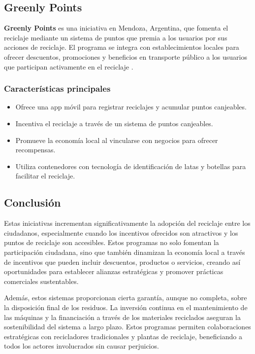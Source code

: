 \documentclass[main.tex]{subfiles}
\begin{document}
\subsection{Greenly Points}
\textbf{Greenly Points} es una iniciativa en Mendoza, Argentina, que fomenta el reciclaje mediante un sistema de puntos que premia a los usuarios por sus acciones de reciclaje. El programa se integra con establecimientos locales para ofrecer descuentos, promociones y beneficios en transporte público a los usuarios que participan activamente en el reciclaje \cite{greenlypoints2024}.

\subsubsection*{Características principales}
\begin{itemize}
    \item Ofrece una app móvil para registrar reciclajes y acumular puntos canjeables.
    \item Incentiva el reciclaje a través de un sistema de puntos canjeables.
    \item Promueve la economía local al vincularse con negocios para ofrecer recompensas.
    \item Utiliza contenedores con tecnología de identificación de latas y botellas para facilitar el reciclaje.
\end{itemize}

\subsection{Conclusión}
Estas iniciativas incrementan significativamente la adopción del reciclaje entre los ciudadanos, especialmente cuando los incentivos ofrecidos son atractivos y los puntos de reciclaje son accesibles. Estos programas no solo fomentan la participación ciudadana, sino que también dinamizan la economía local a través de incentivos que pueden incluir descuentos, productos o servicios, creando así oportunidades para establecer alianzas estratégicas y promover prácticas comerciales sustentables.

Además, estos sistemas proporcionan cierta garantía, aunque no completa, sobre la disposición final de los residuos. La inversión continua en el mantenimiento de las máquinas y la financiación a través de los materiales reciclados aseguran la sostenibilidad del sistema a largo plazo. Estos programas permiten colaboraciones estratégicas con recicladores tradicionales y plantas de reciclaje, beneficiando a todos los actores involucrados sin causar perjuicios.
\end{document}
